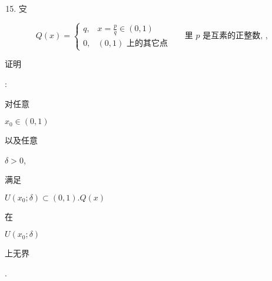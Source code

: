 \documentclass[10pt]{article}
\begin{document}
\begin{enumerate}
  \setcounter{enumi}{14}
  \item \begin{CJK}{UTF8}{mj}㝊\end{CJK}
\end{enumerate}
$$
Q(x)=\left\{\begin{array}{cl}
q, & x=\frac{p}{q} \in(0,1) \\
0, & (0,1) \text { 上的其它点 }
\end{array} \quad \text { 里 } p \text { 是互素的正整数, }\right. \text {, }
$$
\begin{CJK}{UTF8}{mj}证明\end{CJK}: \begin{CJK}{UTF8}{mj}对任意\end{CJK} $x_{0} \in(0,1)$ \begin{CJK}{UTF8}{mj}以及任意\end{CJK} $\delta>0$, \begin{CJK}{UTF8}{mj}满足\end{CJK} $U\left(x_{0} ; \delta\right) \subset(0,1) . Q(x)$ \begin{CJK}{UTF8}{mj}在\end{CJK} $U\left(x_{0} ; \delta\right)$ \begin{CJK}{UTF8}{mj}上无界\end{CJK}.
\end{document}
